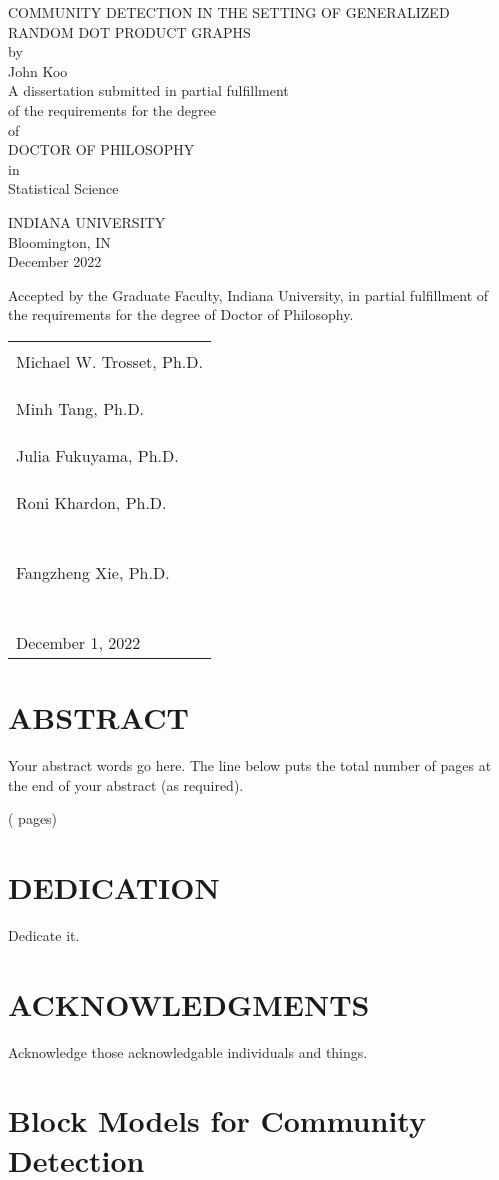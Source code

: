\documentclass{DissertateUSU}
\renewcommand{\maketitle}{
	\thispagestyle{empty}
	\vspace*{\fill}
	\begin{center}
	\doublespaced
	\MakeUppercase{Community Detection in the Setting of Generalized Random
Dot Product Graphs}\\
	by\\
	John Koo \\
	\singlespaced
	A dissertation submitted in partial fulfillment\\
	of the requirements for the degree \\
	\doublespaced
	of\\
	\MakeUppercase{Doctor of Philosophy} \\
	in\\
	\singlespaced
  Statistical Science \\
	\end{center}

  \vspace{20pt}
    \begin{center}
	  \singlespacing
      \MakeUppercase{Indiana University}\\
	    Bloomington, IN\\
	    \doublespacing
	    December 2022
	  \end{center}
	\vspace*{\fill}
	\clearpage
}
\newcommand{\acceptancepage} {
\doublespacing
	\vspace{20pt}
	\noindent Accepted by the Graduate Faculty, Indiana University, in partial fulfillment of the requirements for the degree of Doctor of Philosophy. \\
	\vspace{30pt}
	\noindent
	\begin{tabular}{l}
    \makebox[2.75in]{\hrulefill} \\
    Michael W. Trosset, Ph.D. \\
     \\
     \\
    \makebox[2.75in]{\hrulefill} \\
    Minh Tang, Ph.D. \\
     \\
     \\
    \makebox[2.75in]{\hrulefill} \\
    Julia Fukuyama, Ph.D. \\
     \\
     \\
    \makebox[2.75in]{\hrulefill} \\
    Roni Khardon, Ph.D. \\\
    \\
    \\
    \makebox[2.75in]{\hrulefill} \\
    Fangzheng Xie, Ph.D. \\\
    \\
    \\
    \\
    December 1, 2022 \\

    \end{tabular}

}
\newcommand{\copyrightpage}{
	\vspace*{\fill}
  \begin{center}
	\doublespacing
	Copyright \hspace{3pt}
	  \scshape \small \copyright  \hspace{3pt}
	  John Koo \hspace{3pt} 2022 \\
	All Rights Reserved
  \end{center}
	\vspace*{\fill}
}
\begin{document}
\maketitle


\acceptancepage

\newpage

\pagestyle{plain} \fancyhead[R]{\thepage} \fancyfoot[C]{}

\chapter*{ABSTRACT}

\doublespacing

Your abstract words go here. The line below puts the total number of
pages at the end of your abstract (as required).

\begin{flushright}(\pageref{LastPage} pages)\end{flushright}

\newpage
\fancyhead[R]{\thepage}
\fancyfoot[C]{}
\chapter*{DEDICATION}

Dedicate it.

\newpage
\fancyhead[R]{\thepage}
\fancyfoot[C]{}
\chapter*{ACKNOWLEDGMENTS}

Acknowledge those acknowledgable individuals and things.

\newpage
\fancyhead[R]{\thepage}
\fancyfoot[C]{}
\tableofcontents

\newpage
{}

\newpage
\fancyhead[R]{\thepage}
\fancyfoot[C]{}

\chapter{Block Models for Community Detection}

\doublespacing
\end{document}
